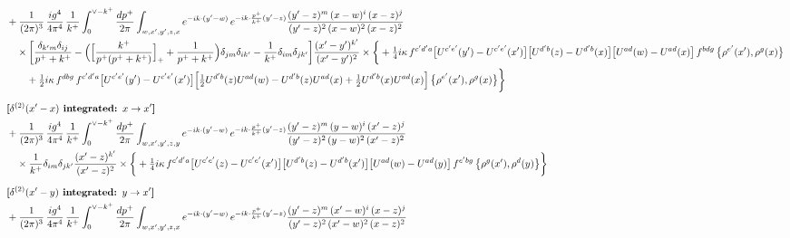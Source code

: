 \documentclass[10pt]{article}
\numberwithin{equation}{section}
\begin{document}
\begin{align}
&+\frac{1}{(2\pi)^{3}}\,\frac{ig^{4}}{4\pi^{4}}\,\frac{1}{k^{+}}\int_{0}^{\vee-k^{+}}\frac{dp^{+}}{2\pi}\int_{w,x^{\prime},y^{\prime},z,x}e^{-ik\cdot(y^{\prime}-w)}\,e^{-ik\cdot\frac{p^{+}}{k^{+}}(y^{\prime}-z)}\frac{(y^{\prime}-z)^{m}\,(x-w)^{i}\,(x-z)^{j}}{(y^{\prime}-z)^{2}\,(x-w)^{2}\,(x-z)^{2}}\notag\\
&\quad\times\bigg[\frac{\delta_{k^{\prime}m}\delta_{ij}}{p^{+}+k^{+}}-\Big(\Big[\frac{k^{+}}{p^{+}(p^{+}+k^{+})}\Big]_{+}+\frac{1}{p^{+}+k^{+}}\Big)\delta_{jm}\delta_{ik^{\prime}}-\frac{1}{k^{+}}\delta_{im}\delta_{jk^{\prime}}\bigg]\frac{(x^{\prime}-y^{\prime})^{k^{\prime}}}{(x^{\prime}-y^{\prime})^{2}}\times\bigg\{+\tfrac14 i\kappa\,f^{c^{\prime}d^{\prime}a}\big[U^{c^{\prime}e^{\prime}}(y^{\prime})-U^{c^{\prime}e^{\prime}}(x^{\prime})\big]\big[U^{d^{\prime}b}(z)-U^{d^{\prime}b}(x)\big]\big[U^{ad}(w)-U^{ad}(x)\big]\,f^{bdg}\,\big\{\rho^{e^{\prime}}(x^{\prime}),\rho^{g}(x)\big\}\notag\\&\qquad+\tfrac12 i\kappa\,f^{dbg}\,f^{c^{\prime}d^{\prime}a}\big[U^{c^{\prime}e^{\prime}}(y^{\prime})-U^{c^{\prime}e^{\prime}}(x^{\prime})\big]\Big[\tfrac12U^{d^{\prime}b}(z)U^{ad}(w)-U^{d^{\prime}b}(z)U^{ad}(x)+\tfrac12U^{d^{\prime}b}(x)U^{ad}(x)\Big]\,\big\{\rho^{e^{\prime}}(x^{\prime}),\rho^{g}(x)\big\}\bigg\}\notag\\[6pt]
&\textbf{[$\delta^{(2)}(x^{\prime}-x)$ integrated: $x\to x^{\prime}$]}\notag\\
&+\frac{1}{(2\pi)^{3}}\,\frac{ig^{4}}{4\pi^{4}}\,\frac{1}{k^{+}}\int_{0}^{\vee-k^{+}}\frac{dp^{+}}{2\pi}\int_{w,x^{\prime},y^{\prime},z,y}e^{-ik\cdot(y^{\prime}-w)}\,e^{-ik\cdot\frac{p^{+}}{k^{+}}(y^{\prime}-z)}\frac{(y^{\prime}-z)^{m}\,(y-w)^{i}\,(x^{\prime}-z)^{j}}{(y^{\prime}-z)^{2}\,(y-w)^{2}\,(x^{\prime}-z)^{2}}\notag\\
&\quad\times\frac{1}{k^{+}}\delta_{im}\delta_{jk^{\prime}}\frac{(x^{\prime}-z)^{k^{\prime}}}{(x^{\prime}-z)^{2}}\times\bigg\{+\tfrac14 i\kappa\,f^{c^{\prime}d^{\prime}a}\big[U^{c^{\prime}e^{\prime}}(z)-U^{c^{\prime}e^{\prime}}(x^{\prime})\big]\big[U^{d^{\prime}b}(z)-U^{d^{\prime}b}(x^{\prime})\big]\big[U^{ad}(w)-U^{ad}(y)\big]\,f^{e^{\prime}bg}\,\big\{\rho^{g}(x^{\prime}),\rho^{d}(y)\big\}\bigg\}\notag\\[6pt]
&\textbf{[$\delta^{(2)}(x^{\prime}-y)$ integrated: $y\to x^{\prime}$]}\notag\\
&+\frac{1}{(2\pi)^{3}}\,\frac{ig^{4}}{4\pi^{4}}\,\frac{1}{k^{+}}\int_{0}^{\vee-k^{+}}\frac{dp^{+}}{2\pi}\int_{w,x^{\prime},y^{\prime},z,x}e^{-ik\cdot(y^{\prime}-w)}\,e^{-ik\cdot\frac{p^{+}}{k^{+}}(y^{\prime}-z)}\frac{(y^{\prime}-z)^{m}\,(x^{\prime}-w)^{i}\,(x-z)^{j}}{(y^{\prime}-z)^{2}\,(x^{\prime}-w)^{2}\,(x-z)^{2}}\notag\\

\end{align}
\end{document}
